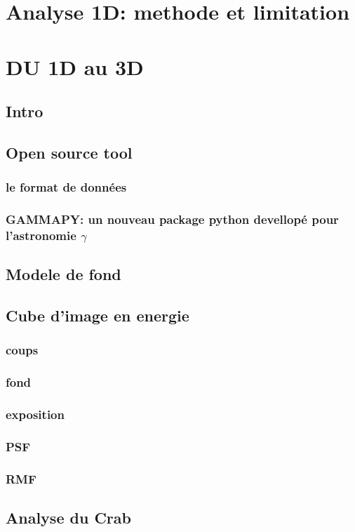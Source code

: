 \documentclass[12pt]{report}
\begin{document}
\chapter{Analyse 1D: methode et limitation}
\chapter{DU 1D au 3D}
\section{Intro}
\section{Open source tool}
\subsection{le format de données}

\subsection{GAMMAPY: un nouveau package python devellopé pour l'astronomie $\gamma$}
\section{Modele de fond}
\section{Cube d'image en energie}
\subsection{coups}
\subsection{fond}
\subsection{exposition}
\subsection{PSF}
\subsection{RMF}

\section{Analyse du Crab}
\end{document}
